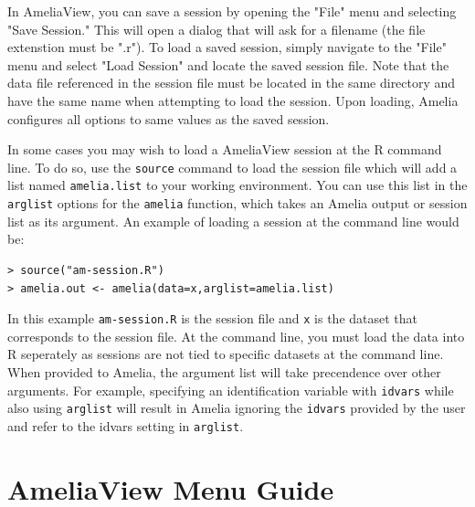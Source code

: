 \documentclass[12pt,titlepage]{article}
\begin{document}
In AmeliaView, you can save a session by opening the "File" menu and 
selecting "Save Session."  This will open a dialog that will ask for a 
filename (the file extenstion must be ".r").  To load a saved session,
simply navigate to the "File" menu and select "Load Session" and locate
the saved session file.  Note that the data file referenced in the session
file must be located in the same directory and have the same name when 
attempting to load the session.  Upon loading, Amelia configures all options 
to same values as the saved session.

In some cases you may wish to load a AmeliaView session at the R command line.
To do so, use the \texttt{source} command to load the session file which 
will add a list named \texttt{amelia.list} to your working environment.  
You can use this list in the \texttt{arglist} options for the 
\texttt{amelia} function, which takes an Amelia output or session
list as its argument.  An example of loading a session at the command
line would be:

\begin{verbatim}
> source("am-session.R") 
> amelia.out <- amelia(data=x,arglist=amelia.list)
\end{verbatim}

In this example \texttt{am-session.R} is the session file and \texttt{x}
is the dataset that corresponds to the session file.  At the command line,
you must load the data into R seperately as sessions are not tied to specific
datasets at the command line.  When provided to Amelia, the argument list 
will take precendence over other arguments.  For example, specifying an 
identification variable with \texttt{idvars} while also using 
\texttt{arglist} will result in Amelia ignoring the \texttt{idvars} 
provided by the user and refer to the idvars setting in \texttt{arglist}.

\section{AmeliaView Menu Guide}
\label{sec:menu}
\end{document}
